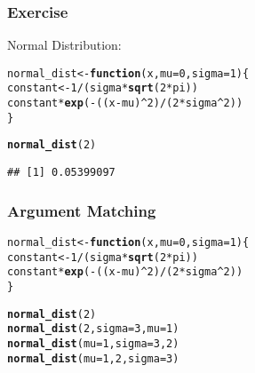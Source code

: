 \documentclass[12pt]{beamer}\usepackage[]{graphicx}\usepackage[]{color}
\makeatletter
\newcommand{\hlnum}[1]{\textcolor[rgb]{0.686,0.059,0.569}{#1}}%
\newcommand{\hlopt}[1]{\textcolor[rgb]{0,0,0}{#1}}%
\newcommand{\hlstd}[1]{\textcolor[rgb]{0.345,0.345,0.345}{#1}}%
\newcommand{\hlkwa}[1]{\textcolor[rgb]{0.161,0.373,0.58}{\textbf{#1}}}%
\newcommand{\hlkwb}[1]{\textcolor[rgb]{0.69,0.353,0.396}{#1}}%
\newcommand{\hlkwc}[1]{\textcolor[rgb]{0.333,0.667,0.333}{#1}}%
\newcommand{\hlkwd}[1]{\textcolor[rgb]{0.737,0.353,0.396}{\textbf{#1}}}%
\newenvironment{kframe}{%
 \def\at@end@of@kframe{}%
 \ifinner\ifhmode%
  \def\at@end@of@kframe{\end{minipage}}%
  \begin{minipage}{\columnwidth}%
 \fi\fi%
 \def\FrameCommand##1{\hskip\@totalleftmargin \hskip-\fboxsep
 \colorbox{shadecolor}{##1}\hskip-\fboxsep
     \hskip-\linewidth \hskip-\@totalleftmargin \hskip\columnwidth}%
 \MakeFramed {\advance\hsize-\width
   \@totalleftmargin\z@ \linewidth\hsize
   \@setminipage}}%
 {\par\unskip\endMakeFramed%
 \at@end@of@kframe}
\newenvironment{knitrout}{}{} %
\makeatother
\begin{document}

\begin{frame}[fragile]
\frametitle{Exercise}

Normal Distribution:
\begin{knitrout}\footnotesize
{}\color{fgcolor}\begin{kframe}
\begin{alltt}
\hlstd{normal_dist} \hlkwb{<-} \hlkwa{function}\hlstd{(}\hlkwc{x}\hlstd{,} \hlkwc{mu} \hlstd{=} \hlnum{0}\hlstd{,} \hlkwc{sigma} \hlstd{=} \hlnum{1}\hlstd{) \{}
  \hlstd{constant} \hlkwb{<-} \hlnum{1} \hlopt{/} \hlstd{(sigma} \hlopt{*} \hlkwd{sqrt}\hlstd{(}\hlnum{2}\hlopt{*}\hlstd{pi))}
  \hlstd{constant} \hlopt{*} \hlkwd{exp}\hlstd{(}\hlopt{-}\hlstd{((x} \hlopt{-} \hlstd{mu)}\hlopt{^}\hlnum{2}\hlstd{)} \hlopt{/} \hlstd{(}\hlnum{2} \hlopt{*} \hlstd{sigma}\hlopt{^}\hlnum{2}\hlstd{))}
\hlstd{\}}

\hlkwd{normal_dist}\hlstd{(}\hlnum{2}\hlstd{)}
\end{alltt}
\begin{verbatim}
## [1] 0.05399097
\end{verbatim}
\end{kframe}
\end{knitrout}

\end{frame}


\begin{frame}[fragile]
\frametitle{Argument Matching}

\begin{knitrout}\footnotesize
{}\color{fgcolor}\begin{kframe}
\begin{alltt}
\hlstd{normal_dist} \hlkwb{<-} \hlkwa{function}\hlstd{(}\hlkwc{x}\hlstd{,} \hlkwc{mu} \hlstd{=} \hlnum{0}\hlstd{,} \hlkwc{sigma} \hlstd{=} \hlnum{1}\hlstd{) \{}
  \hlstd{constant} \hlkwb{<-} \hlnum{1} \hlopt{/} \hlstd{(sigma} \hlopt{*} \hlkwd{sqrt}\hlstd{(}\hlnum{2}\hlopt{*}\hlstd{pi))}
  \hlstd{constant} \hlopt{*} \hlkwd{exp}\hlstd{(}\hlopt{-}\hlstd{((x} \hlopt{-} \hlstd{mu)}\hlopt{^}\hlnum{2}\hlstd{)} \hlopt{/} \hlstd{(}\hlnum{2} \hlopt{*} \hlstd{sigma}\hlopt{^}\hlnum{2}\hlstd{))}
\hlstd{\}}

\hlkwd{normal_dist}\hlstd{(}\hlnum{2}\hlstd{)}
\hlkwd{normal_dist}\hlstd{(}\hlnum{2}\hlstd{,} \hlkwc{sigma} \hlstd{=} \hlnum{3}\hlstd{,} \hlkwc{mu} \hlstd{=} \hlnum{1}\hlstd{)}
\hlkwd{normal_dist}\hlstd{(}\hlkwc{mu} \hlstd{=} \hlnum{1}\hlstd{,} \hlkwc{sigma} \hlstd{=} \hlnum{3}\hlstd{,} \hlnum{2}\hlstd{)}
\hlkwd{normal_dist}\hlstd{(}\hlkwc{mu} \hlstd{=} \hlnum{1}\hlstd{,} \hlnum{2}\hlstd{,} \hlkwc{sigma} \hlstd{=} \hlnum{3}\hlstd{)}
\end{alltt}
\end{kframe}
\end{knitrout}

\end{frame}
\end{document}
